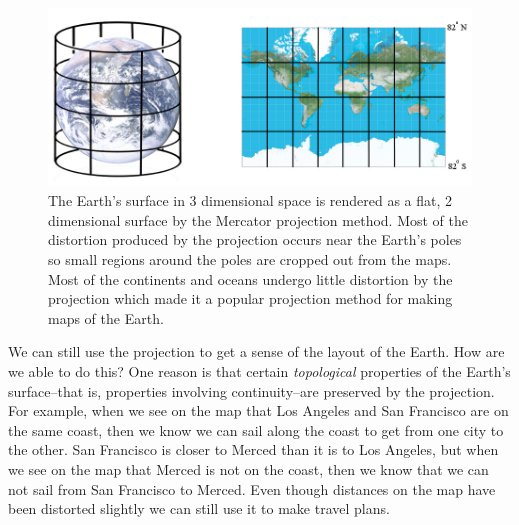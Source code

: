 \begin{figure}[h]
\centering
\includegraphics[scale=1.8]{./images/Mercator.jpg}
\caption[Scott Hotton's modification of an image from the Cartographic Research Lab at the University of Alabama.]{The Earth's surface in 3 dimensional space is rendered as a flat, 2
dimensional surface by the Mercator projection method. Most of the distortion
produced by the projection occurs near the Earth's poles so small regions 
around the poles are cropped out from the maps. Most of the continents and
oceans undergo little distortion by the projection which made it a popular 
projection method for making maps of the Earth.} 
\label{Mercator}
\end{figure}




   We can still use the projection to get a sense of the layout of the Earth. 
How are we able to do this?  One reason is that certain {\em topological} 
properties of the Earth's surface--that is, properties involving 
continuity--are preserved by the projection. For example, when we see on the 
map that Los Angeles and San Francisco are on the same coast, then we know we 
can sail along the coast to get from one city to the other. San Francisco is
closer to Merced than it is to Los Angeles, but when we see on the map that 
Merced is not on the coast, then we know that we can not sail from San Francisco 
to Merced. Even though distances on the map have been distorted slightly we 
can still use it to make travel plans. 

